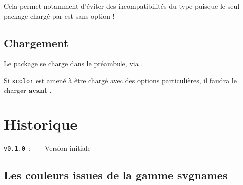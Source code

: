 \documentclass[french,11pt,a4paper]{article}
\begin{document}
\smallskip

Cela permet notamment d'éviter des incompatibilités du type  puisque le seul package chargé par  est  sans option !

\subsection{Chargement}

Le package se charge dans le préambule, via .

Si \texttt{xcolor} est amené à être chargé avec des options particulières, il faudra le charger \textbf{avant} .



\pagebreak

\section{Historique}

\verb|v0.1.0|~:~~~~Version initiale

\subsection{Les couleurs issues de la gamme \og svgnames \fg}
\end{document}

